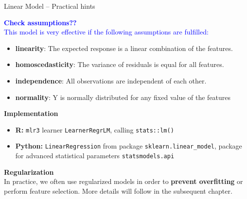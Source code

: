 \documentclass[11pt,compress,t,notes=noshow, xcolor=table]{beamer}
\newcommand{\highlight}[1]{\textcolor{highlightcol}{\textbf{#1}}}
\let\code=\texttt
\begin{document}
\begin{frame}{Linear Model -- Practical hints}

\footnotesize

 \highlight{\textcolor{blue}{Check assumptions??} }\\
 \textcolor{blue}{This model is very effective if the following assumptions are fulfilled:}
 \begin{itemize}\footnotesize
  \item \textbf{linearity}: The expected response is a linear combination of the features.
  \item \textbf{homoscedasticity}: The variance of residuals is equal for all features.
  \item \textbf{independence}: All observations are independent of each other.
  \item \textbf{normality}: Y is normally distributed for any fixed value of the features
\end{itemize}


\medskip

  \highlight{Implementation}
  
  \begin{itemize}
    \item \textbf{R:} \code{mlr3} learner \code{LearnerRegrLM}, calling \code{stats::lm()}
    \item \textbf{Python:} \code{LinearRegression} from package 
    \code{sklearn.linear\_model}, package for advanced statistical parameters 
    \code{statsmodels.api} 
  \end{itemize}

\medskip

 \highlight{Regularization} \\

 In practice, we often use regularized models in order to \textbf{prevent overfitting} or perform feature selection. More details will follow in the subsequent chapter. 


\end{frame}

\end{document}
